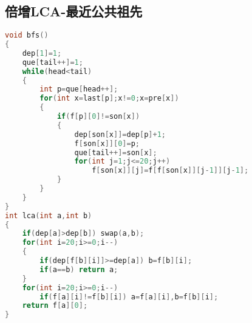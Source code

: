 \subsection{倍增LCA-最近公共祖先}
    \begin{lstlisting}[language=c++]
void bfs()
{
    dep[1]=1;
    que[tail++]=1;
    while(head<tail)
    {
        int p=que[head++];
        for(int x=last[p];x!=0;x=pre[x])
        {
            if(f[p][0]!=son[x])
            {
                dep[son[x]]=dep[p]+1;
                f[son[x]][0]=p;
                que[tail++]=son[x];
                for(int j=1;j<=20;j++)
                    f[son[x]][j]=f[f[son[x]][j-1]][j-1];
            }    
        }    
    }
}
int lca(int a,int b)
{
    if(dep[a]>dep[b]) swap(a,b);
    for(int i=20;i>=0;i--)
    {
        if(dep[f[b][i]]>=dep[a]) b=f[b][i];
        if(a==b) return a;    
    }    
    for(int i=20;i>=0;i--)
        if(f[a][i]!=f[b][i]) a=f[a][i],b=f[b][i];
    return f[a][0];
}
    \end{lstlisting}